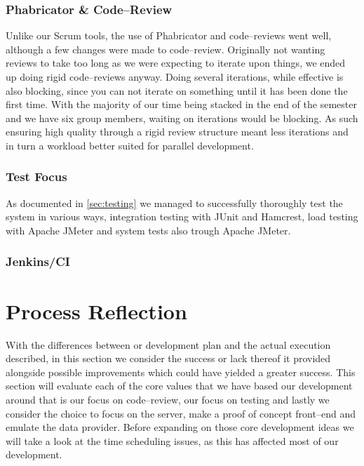 \subsubsection{Phabricator \& Code--Review}
Unlike our Scrum tools, the use of Phabricator and code--reviews went well, although a few changes were made to code--review.
Originally not wanting reviews to take too long as we were expecting to iterate upon things, we ended up doing rigid code--reviews anyway.
Doing several iterations, while effective is also blocking, since you can not iterate on something until it has been done the first time.
With the majority of our time being stacked in the end of the semester and we have six group members, waiting on iterations would be blocking. 
As such ensuring high quality through a rigid review structure meant less iterations and in turn a workload better suited for parallel development.
\subsubsection{Test Focus}
As documented in \cref{sec:testing} we managed to successfully thoroughly test the system in various ways, integration testing with JUnit and Hamcrest, load testing with Apache JMeter and system tests also trough Apache JMeter.
\subsubsection{Jenkins/CI}
\section{Process Reflection}
With the differences between or development plan and the actual execution described, in this section we consider the success or lack thereof it provided alongside possible improvements which could have yielded a greater success.
This section will evaluate each of the core values that we have based our development around that is our focus on code--review, our focus on testing and lastly we consider the choice to focus on the server, make a proof of concept front--end and emulate the data provider.
Before expanding on those core development ideas we will take a look at the time scheduling issues, as this has affected most of our development.
